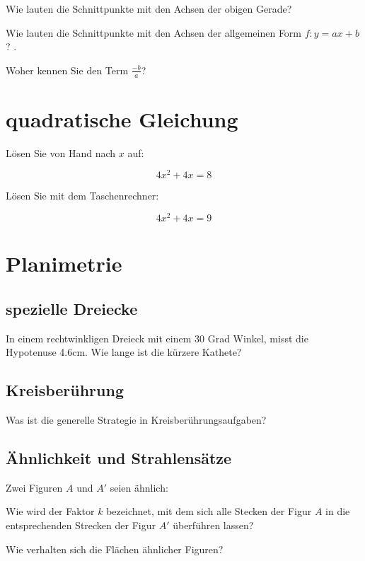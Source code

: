 Wie lauten die Schnittpunkte mit den Achsen der obigen Gerade?

Wie lauten die Schnittpunkte mit den Achsen der allgemeinen Form $f: y=ax+b$? .

Woher kennen Sie den Term $\frac{-b}{a}$?

\section{quadratische Gleichung}
Lösen Sie von Hand nach $x$ auf:

$$4x^2 +4x = 8$$

Lösen Sie mit dem Taschenrechner:

$$4x^2 + 4x = 9$$


\section{Planimetrie}
\subsection{spezielle Dreiecke}
In einem rechtwinkligen Dreieck mit einem 30 Grad Winkel, misst die Hypotenuse 4.6cm. Wie lange ist die kürzere Kathete? 

\subsection{Kreisberührung}
Was ist die generelle Strategie in Kreisberührungsaufgaben?

\subsection{Ähnlichkeit und Strahlensätze}
Zwei Figuren $A$ und $A'$ seien ähnlich:

Wie wird der Faktor $k$ bezeichnet, mit dem sich alle Stecken der Figur $A$ in die entsprechenden Strecken der Figur $A'$ überführen lassen?

Wie verhalten sich die Flächen ähnlicher Figuren?



